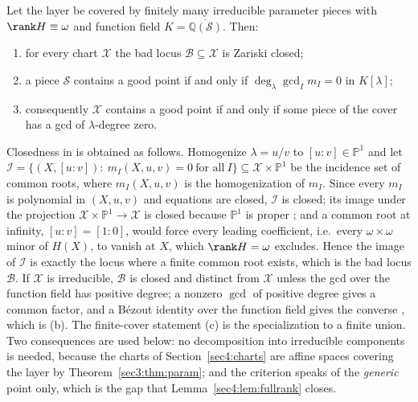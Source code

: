 \begin{thm}
\label{sec4:thm:closed}
\label{sec4:thm:generic}
\label{sec4:prop:cover}
Let the layer be covered by finitely many irreducible parameter pieces with $\rank H\equiv\omega$ and
function field $K=\overline{\mathbb Q(\mathcal S)}$. Then:
\begin{enumerate}[label=(\alph*),leftmargin=*]
\item \label{it:closed} for every chart $\mathcal X$ the bad locus $\mathcal B\subseteq\mathcal X$ is
Zariski closed;
\item \label{it:generic} a piece $\mathcal S$ contains a good point if and only if
$\deg_\lambda\gcd_I m_I=0$ in $K[\lambda]$;
\item \label{it:cover} consequently $\mathcal X$ contains a good point if and only if some piece of the
cover has a gcd of $\lambda$-degree zero.
\end{enumerate}
\end{thm}

Closedness in \cite{companion1} is obtained as follows. Homogenize $\lambda=u/v$ to
$[u{:}v]\in\mathbb P^1$ and let
$\mathcal I=\{(X,[u{:}v]):\ m_I(X,u,v)=0\ \text{for all}\ I\}\subseteq\mathcal X\times\mathbb P^1$ be
the incidence set of common roots, where $m_I(X,u,v)$ is the homogenization of $m_I$. Since every
$m_I$ is polynomial in $(X,u,v)$ and equations are closed, $\mathcal I$ is closed; its image under the
projection $\mathcal X\times\mathbb P^1\to\mathcal X$ is closed because $\mathbb P^1$ is proper
\cite{bpr06}; and a common root at infinity, $[u{:}v]=[1{:}0]$, would force every leading coefficient,
i.e.\ every $\omega\times\omega$ minor of $H(X)$, to vanish at $X$, which $\rank H=\omega$ excludes.
Hence the image of $\mathcal I$ is exactly the locus where a finite common root exists, which is the
bad locus $\mathcal B$. If $\mathcal X$ is irreducible, $\mathcal B$ is closed and distinct from
$\mathcal X$ unless the gcd over the function field has positive degree; a nonzero $\gcd$ of positive
degree gives a common factor, and a Bézout identity over the function field gives the converse
\cite{lan02}, which is (b). The finite-cover statement (c) is the specialization to a finite union.
Two consequences are used below: no decomposition into irreducible components is needed, because the
charts of Section~\ref{sec4:charts} are affine spaces covering the layer by
Theorem~\ref{sec3:thm:param}; and the criterion speaks of the \emph{generic} point only, which is the
gap that Lemma~\ref{sec4:lem:fullrank} closes.

